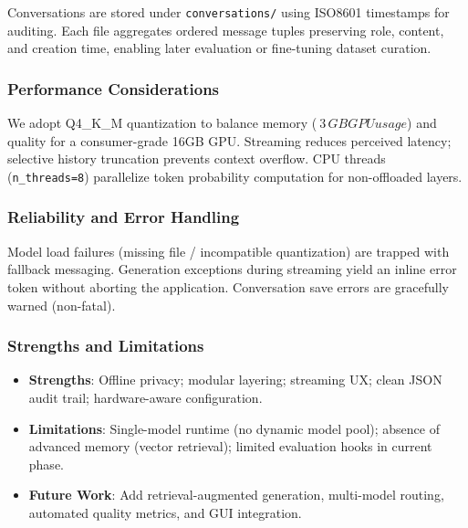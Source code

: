 \documentclass[12pt,a4paper]{article}
\begin{document}
Conversations are stored under \texttt{conversations/} using ISO8601 timestamps for auditing. Each file aggregates ordered message tuples preserving role, content, and creation time, enabling later evaluation or fine-tuning dataset curation.

\subsubsection*{Performance Considerations}

We adopt Q4\_K\_M quantization to balance memory (\(~3\,GB GPU usage\)) and quality for a consumer-grade 16GB GPU. Streaming reduces perceived latency; selective history truncation prevents context overflow. CPU threads (\texttt{n\_threads=8}) parallelize token probability computation for non-offloaded layers.

\subsubsection*{Reliability and Error Handling}

Model load failures (missing file / incompatible quantization) are trapped with fallback messaging. Generation exceptions during streaming yield an inline error token without aborting the application. Conversation save errors are gracefully warned (non-fatal).

\subsubsection*{Strengths and Limitations}

\begin{itemize}[leftmargin=1.2em]
    \item \textbf{Strengths}: Offline privacy; modular layering; streaming UX; clean JSON audit trail; hardware-aware configuration.
    \item \textbf{Limitations}: Single-model runtime (no dynamic model pool); absence of advanced memory (vector retrieval); limited evaluation hooks in current phase.
    \item \textbf{Future Work}: Add retrieval-augmented generation, multi-model routing, automated quality metrics, and GUI integration.
\end{itemize}
\end{document}
